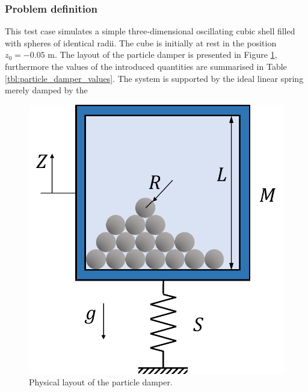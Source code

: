 \documentclass[a4paper,12pt,openany]{book}
\theoremstyle{break}
\begin{document}
\subsubsection{Problem definition}
This test case simulates a simple three-dimensional oscillating cubic shell filled with spheres of identical radii. The cube is initially at rest in the position $z_0=-0.05$ m. The layout of the particle damper is presented in Figure \ref{fig:particle_damper_geom}, furthermore the values of the introduced quantities are summarised in Table \ref{tbl:particle_damper_values}. The system is supported by the ideal linear spring  merely damped by the 
\begin{figure}[h!]
  \includegraphics[scale=0.5]{particle_damper_geom.pdf}
  \centering
  \caption{Physical layout of the particle damper.}
  \label{fig:particle_damper_geom}
\end{figure}\vspace*{3pt}
\end{document}
